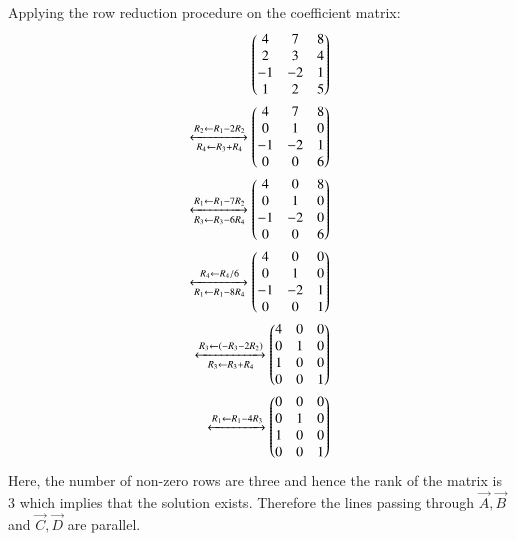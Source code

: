 \documentclass[journal,12pt,twocolumn]{IEEEtran}
\begin{document}
Applying the row reduction procedure on the coefficient matrix:
\begin{align}
	\begin{pmatrix}4 & 7 & 8\\ 2 & 3 & 4\\ -1 & -2 & 1\\ 1 & 2 & 5\end{pmatrix}\\
	\xleftrightarrow[R_4 \leftarrow R_3 + R_4]{R_2 \leftarrow R_1 - 2R_2}
	\begin{pmatrix}4 & 7 & 8\\ 0 & 1 & 0\\ -1 & -2 & 1\\ 0 & 0 & 6\end{pmatrix}\\
	\xleftrightarrow[R_3 \leftarrow R_3 - 6R_4]{R_1 \leftarrow R_1 - 7R_2}
	\begin{pmatrix}4 & 0 & 8\\ 0 & 1 & 0\\ -1 & -2 & 0\\ 0 & 0 & 6\end{pmatrix}\\
	\xleftrightarrow[R_1 \leftarrow R_1 - 8R_4]{R_4 \leftarrow R_4/6}
	\begin{pmatrix}4 & 0 & 0\\ 0 & 1 & 0\\ -1 & -2 & 1\\ 0 & 0 & 1 \end{pmatrix} \\
    \xleftrightarrow[R_3 \leftarrow R_3 + R_4]{R_3 \leftarrow (-R_3 - 2R_2)}
	\begin{pmatrix}4 & 0 & 0\\ 0 & 1 & 0\\ 1 & 0 & 0\\ 0 & 0 & 1\end{pmatrix}\\
	\xleftrightarrow{R_1 \leftarrow R_1 - 4R_3}
	\begin{pmatrix}0 & 0 & 0\\ 0 & 1 & 0\\ 1 & 0 & 0\\ 0 & 0 & 1\end{pmatrix}
\end{align}
Here, the number of non-zero rows are three and hence the rank of the matrix is 3 which implies that the solution exists. Therefore the lines passing through $\vec{A}, \vec{B}$ and $\vec{C}, \vec{D}$ are parallel.
\end{document}
